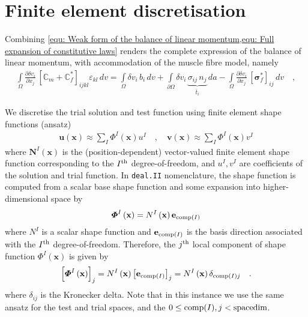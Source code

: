 \documentclass[]{scrartcl}
\begin{document}
\section{Finite element discretisation}
Combining \cref{equ: Weak form of the balance of linear momentum,equ: Full expansion of constitutive laws} renders the complete expression of the balance of linear momentum, with accommodation of the muscle fibre model, namely
\begin{gather}
\int\limits_{\Omega} \frac{\partial \delta v_{i}}{\partial x_{j}} \, \left[ \boldsymbol{\mathbb{C}}_{m} + \boldsymbol{\mathbb{C}}_{f}^{\ast} \right]_{ijkl} \varepsilon_{kl} \, dv
  = \int\limits_{\Omega} \delta v_{i} \, b_{i} \, dv
  + \int\limits_{\partial\Omega} \delta v_{i} \, \underbrace{\sigma_{ij} \, n_{j}}_{\bar{t}_{i}} \, da
  - \int\limits_{\Omega} \frac{\partial \delta v_{i}}{\partial x_{j}} \, \left[ \boldsymbol{\sigma}_{f}^{\ast} \right]_{ij} \, dv
\quad ,
\label{equ: Weak form of the balance of linear momentum: Muscle model}
\end{gather}

We discretise the trial solution and test function using finite element shape functions (ansatz)
\begin{gather}
\mathbf{u} \left( \mathbf{x} \right)
  \approx \sum\limits_{I} \boldsymbol{\varPhi}^{I} \left( \mathbf{x} \right) u^{I}
\quad , \quad
\mathbf{v} \left( \mathbf{x} \right)
  \approx \sum\limits_{I} \boldsymbol{\varPhi}^{I} \left( \mathbf{x} \right) v^{I}
\end{gather}
where $\mathbf{N}^{I} \left( \mathbf{x} \right)$ is the (position-dependent) vector-valued finite element shape function corresponding to the $I^{\textnormal{th}}$ degree-of-freedom, and $u^{I}, v^{I}$ are coefficients of the solution and trial function.
In \texttt{deal.II} nomenclature, the shape function is computed from a scalar base shape function and some expansion into higher-dimensional space by
\begin{gather}
\boldsymbol{\varPhi}^{I} \left( \mathbf{x} \right) 
  = N^{I} \left( \mathbf{x} \right) \mathbf{e}_{\textnormal{comp}(I)}
\end{gather}
where $N^{I}$ is a scalar shape function and $\mathbf{e}_{\textnormal{comp}(I)}$ is the basis direction associated with the $I^{\textnormal{th}}$ degree-of-freedom.
Therefore, the $j^{\textnormal{th}}$ local component of shape function $\boldsymbol{\varPhi}^{I} \left( \mathbf{x} \right)$ is given by
\begin{gather}
\left[\boldsymbol{\varPhi}^{I} \left( \mathbf{x} \right)\right]_{j}
  = N^{I} \left( \mathbf{x} \right) \left[ \mathbf{e}_{\textnormal{comp}(I)} \right]_{j}
  = N^{I} \left( \mathbf{x} \right) \delta_{\textnormal{comp}(I) j}
\quad .
\end{gather}
where $\delta_{ij}$ is the Kronecker delta. 
Note that in this instance we use the same ansatz for the test and trial spaces, and the $0 \leq \textnormal{comp}(I), j < \textnormal{spacedim}$.
\end{document}

